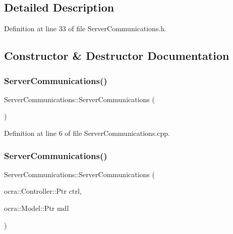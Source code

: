 \subsection{Detailed Description}


Definition at line 33 of file Server\+Communications.\+h.



\subsection{Constructor \& Destructor Documentation}
\hypertarget{classocra__recipes_1_1ServerCommunications_aa2a8a9d66c8ade82af5f27d550423370}{}\label{classocra__recipes_1_1ServerCommunications_aa2a8a9d66c8ade82af5f27d550423370} 
\subsubsection{\texorpdfstring{Server\+Communications()}{ServerCommunications()}\hspace{0.1cm}{\footnotesize\ttfamily [1/2]}}
{\footnotesize\ttfamily Server\+Communications\+::\+Server\+Communications (\begin{DoxyParamCaption}{ }\end{DoxyParamCaption})}



Definition at line 6 of file Server\+Communications.\+cpp.

\hypertarget{classocra__recipes_1_1ServerCommunications_acfb66941fd506637d019a620628a6c42}{}\label{classocra__recipes_1_1ServerCommunications_acfb66941fd506637d019a620628a6c42} 
\subsubsection{\texorpdfstring{Server\+Communications()}{ServerCommunications()}\hspace{0.1cm}{\footnotesize\ttfamily [2/2]}}
{\footnotesize\ttfamily Server\+Communications\+::\+Server\+Communications (\begin{DoxyParamCaption}\item[{ocra\+::\+Controller\+::\+Ptr}]{ctrl,  }\item[{ocra\+::\+Model\+::\+Ptr}]{mdl }\end{DoxyParamCaption})}



